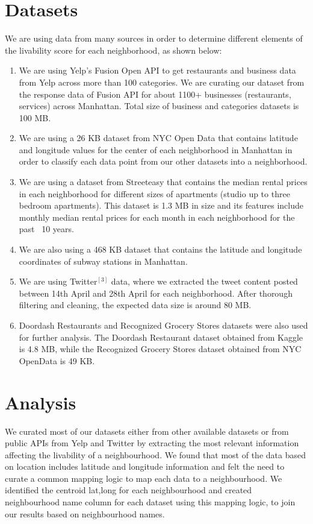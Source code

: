 \documentclass{article}
\begin{document}
\section{Datasets}
We are using data from many sources in order to determine different elements of the livability score for each neighborhood, as shown below: 
\begin{enumerate}
  \item We are using Yelp's Fusion Open API to get restaurants and business data from Yelp across more than 100 categories. We are curating our dataset from the response data of Fusion API for about 1100+ businesses (restaurants, services) across Manhattan. Total size of business and categories datasets is 100 MB.
  \item We are using a 26 KB dataset from NYC Open Data that contains latitude and longitude values for the center of each neighborhood in Manhattan in order to classify each data point from our other datasets into a neighborhood.
  \item We are using a dataset from Streeteasy that contains the median rental prices in each neighborhood for different sizes of apartments (studio up to three bedroom apartments).  This dataset is 1.3 MB in size and its features include monthly median rental prices for each month in each neighborhood for the past ~10 years.
  \item We are also using a 468 KB dataset that contains the latitude and longitude coordinates of subway stations in Manhattan.
  \item We are using Twitter$^{[3]}$ data, where we extracted the tweet content posted between 14th April and 28th April for each neighborhood. After thorough filtering and cleaning, the expected data size is around 80 MB. 
  \item Doordash Restaurants and Recognized Grocery Stores datasets were also used for further analysis. The Doordash Restaurant dataset obtained from Kaggle is 4.8 MB, while the Recognized Grocery Stores dataset obtained from NYC OpenData is 49 KB. 
\end{enumerate}

\section{Analysis}
We curated most of our datasets either from other available datasets or from public APIs from Yelp and Twitter by extracting the most relevant information affecting the livability of a neighbourhood. We found that most of the data based on location includes latitude and longitude information and felt the need to curate a common mapping logic to map each data to a neighbourhood. We identified the centroid lat,long for each neighbourhood and created neighbourhood name column for each dataset using this mapping logic, to join our results based on neighbourhood names. 
\end{document}
